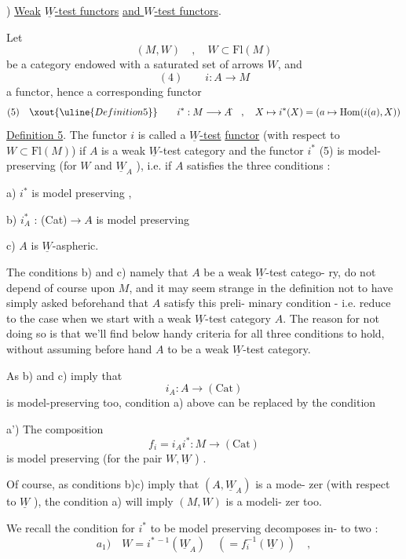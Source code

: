 
) \uline{Weak}  \uline{$\underline{W}$-test functors} \uline{and $W$-test functors}.

Let 
\[ (M,W) \quad , \quad W \subset \mathrm{Fl}(M) \]
be a category endowed with a saturated set of arrows $W$, and
\[ (4) \qquad i : A \longrightarrow M \]
a functor, hence a corresponding functor
\[ (5) \quad \xout{\uline{Definition 5}} \qquad i^* : M \longrightarrow A\hat{} \quad , \quad X \mapsto i^*(X) = (a \mapsto \mathrm{Hom}(i(a),X)) \]
\uline{Definition 5}. The functor $i$ is called a  \uline{$\underline{W}$-test} \uline{functor} (with respect to 
$W \subset \mathrm{Fl}(M)$) if  $A$ is a weak $\underline{W}$-test category\hand{,}
and the functor $i^*$ (5) is model-preserving (for $W$ and $\underline{W}_A$ ), i.e. if
$A$ satisfies the three conditions :

a) $i^*$ is model preserving ,

b) $i^*_A$ : (Cat)$\rightarrow A\hat{}$ is model preserving\hand{,}

c) $A$ is $\underline{W}$-aspheric.

The conditions b) and c) namely that $A$ be a weak  $\underline{W}$-test catego-%
ry, do not depend of course upon $M$, and it may seem strange in the
definition not to have simply asked beforehand that $A$ satisfy this preli-%
minary condition - i.e. reduce to the case when we start with a weak
$\underline{W}$-test category $A$. The reason for not doing so is that we'll find below
handy criteria for all three conditions to hold, without assuming before
\unsure{-}hand $A$ to be a weak $\underline{W}$-test category.

As b) and c) imply that
\[ i_A : A\hat{} \rightarrow (\mathrm{Cat}) \]
is model-preserving too, condition a) above can be replaced by the
condition

a') The composition
\[ f_i = i_A i^* : M \longrightarrow (\mathrm{Cat}) \]
is model preserving (for the pair $W,\underline{W}$ ) .

Of course, as conditions b)\hand{,}c) imply that  $(A\hat{}, \underline{W}_A)$ is a mode-%
zer (with respect to $\underline{W}$ ), the condition a) will imply $(M,W)$ is a modeli-%
zer too.

We recall the condition for $i^*$ to be model preserving decomposes in-%
to two :
\[ a_1) \quad W = i^{*\,-1}(\underline{W}_A) \quad ( = f_i^{-1}(\underline{W})) \quad , \]

